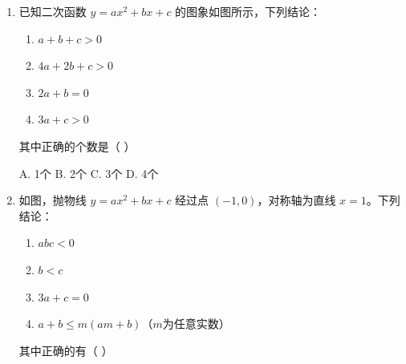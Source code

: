 \documentclass[12pt, a4paper]{article}
\begin{document}
\begin{examplebox}
\begin{enumerate}[label=\textbf{例\arabic*.}]
        \vspace{0.5cm}
        
        \item 已知二次函数 $y = ax^2 + bx + c$ 的图象如图所示，下列结论：
        \begin{enumerate}
            \item[(1)] $a+b+c > 0$
            \item[(2)] $4a+2b+c > 0$ 
            \item[(3)] $2a+b = 0$
            \item[(4)] $3a+c > 0$
        \end{enumerate}
        其中正确的个数是（ \quad ）
        
        \begin{minipage}{0.3\textwidth}
        \end{minipage}
        \begin{minipage}{0.65\textwidth}
            A. 1个 \quad B. 2个 \quad C. 3个 \quad D. 4个
        \end{minipage}
        
        \vspace{0.5cm}
        
        \item 如图，抛物线 $y = ax^2 + bx + c$ 经过点 $(-1,0)$，对称轴为直线 $x=1$。下列结论：
        \begin{enumerate}
            \item[(1)] $abc < 0$
            \item[(2)] $b < c$
            \item[(3)] $3a+c = 0$
            \item[(4)] $a+b \leqslant m(am+b)$（$m$为任意实数）
        \end{enumerate}
        其中正确的有（ \quad ）
        

\end{enumerate}
\end{examplebox}
\end{document}
